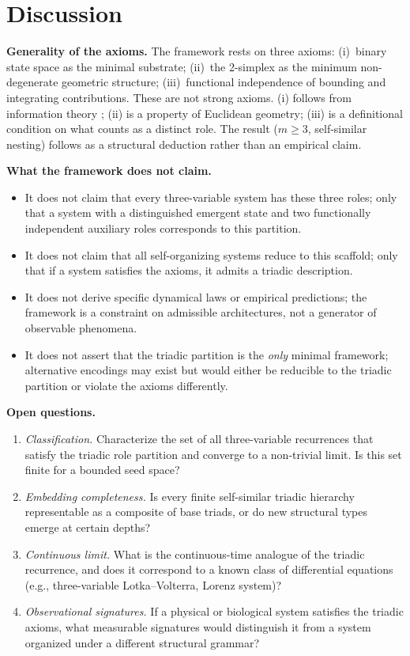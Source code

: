 \documentclass[12pt]{article}
\theoremstyle{definition}
\theoremstyle{remark}
\begin{document}
\section{Discussion}\label{sec:discussion}

\textbf{Generality of the axioms.}  The framework rests on three axioms: (i)~binary
state space as the minimal substrate; (ii)~the 2-simplex as the minimum non-degenerate
geometric structure; (iii)~functional independence of bounding and integrating
contributions.  These are not strong axioms.  (i) follows from information theory
\cite{Sha48}; (ii) is a property of Euclidean geometry; (iii) is a definitional
condition on what counts as a distinct role.  The result ($m \ge 3$, self-similar
nesting) follows as a structural deduction rather than an empirical claim.

\textbf{What the framework does not claim.}
\begin{itemize}
  \item It does not claim that every three-variable system has these three roles; only
        that a system with a distinguished emergent state and two functionally independent
        auxiliary roles corresponds to this partition.
  \item It does not claim that all self-organizing systems reduce to this scaffold; only
        that if a system satisfies the axioms, it admits a triadic description.
  \item It does not derive specific dynamical laws or empirical predictions; the
        framework is a constraint on admissible architectures, not a generator of
        observable phenomena.
  \item It does not assert that the triadic partition is the \emph{only} minimal
        framework; alternative encodings may exist but would either be reducible to the
        triadic partition or violate the axioms differently.
\end{itemize}

\textbf{Open questions.}
\begin{enumerate}
  \item \textit{Classification.}  Characterize the set of all three-variable recurrences
        that satisfy the triadic role partition and converge to a non-trivial limit.  Is
        this set finite for a bounded seed space?
  \item \textit{Embedding completeness.}  Is every finite self-similar triadic hierarchy
        representable as a composite of base triads, or do new structural types emerge
        at certain depths?
  \item \textit{Continuous limit.}  What is the continuous-time analogue of the triadic
        recurrence, and does it correspond to a known class of differential equations
        (e.g., three-variable Lotka--Volterra, Lorenz system)?
  \item \textit{Observational signatures.}  If a physical or biological system satisfies
        the triadic axioms, what measurable signatures would distinguish it from a system
        organized under a different structural grammar?
\end{enumerate}
\end{document}
